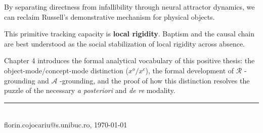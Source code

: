 \documentclass[10pt]{article}
\begin{document}
By separating directness from infallibility through neural attractor dynamics, we can reclaim Russell's demonstrative mechanism for physical objects.

This primitive tracking capacity is \textbf{local rigidity}. Baptism and the causal chain are best understood as the social stabilization of local rigidity across absence.

Chapter 4 introduces the formal analytical vocabulary of this positive thesis: the object-mode/concept-mode distinction (\(x^o/x^c\)), the formal development of \(\mathcal{R}\) -grounding and \(\mathcal{A}\) -grounding, and the proof of how this distinction resolves the puzzle of the necessary \emph{a posteriori} and \emph{de re} modality.

\vfill
\noindent\rule{\textwidth}{0.35pt}\\[1pt]
{\tiny florin.cojocariu@s.unibuc.ro, \today}
\end{document}
